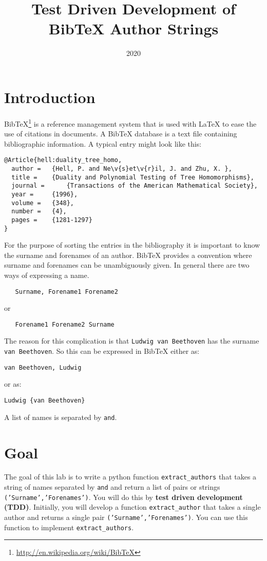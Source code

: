 \documentclass[10pt]{paper}
\title{Test Driven Development of Bib\TeX{} Author Strings}
\date{2020}
\begin{document}
\maketitle
\section*{Introduction}
Bib\TeX\footnote{\url{http://en.wikipedia.org/wiki/BibTeX}} is a
reference management system that is used with La\TeX{} to ease the use
of citations in documents. A Bib\TeX{} database is a text file
containing bibliographic information. A typical entry might look like this:
\begin{verbatim}
@Article{hell:duality_tree_homo,
  author = 	 {Hell, P. and Ne\v{s}et\v{r}il, J. and Zhu, X. },
  title = 	 {Duality and Polynomial Testing of Tree Homomorphisms},
  journal = 	 {Transactions of the American Mathematical Society},
  year = 	 {1996},
  volume =	 {348},
  number =	 {4},
  pages =	 {1281-1297}
}
\end{verbatim}

For the purpose of sorting the entries in the bibliography it is
important to know the surname and forenames of an author. Bib\TeX{}
provides a convention where surname and forenames can be unambiguously
given. In general there are two ways of expressing a name.
\begin{verbatim}
   Surname, Forename1 Forename2
\end{verbatim}
or
\begin{verbatim}
   Forename1 Forename2 Surname
\end{verbatim}
The reason for this complication is that {\tt Ludwig van Beethoven}
has the surname {\tt van Beethoven}. So this can be expressed in
Bib\TeX{} either as: 
\begin{verbatim}
van Beethoven, Ludwig
\end{verbatim}
or as: 
\begin{verbatim}
Ludwig {van Beethoven}
\end{verbatim}

A list of names is separated by {\tt and}. 

\section*{Goal}
The goal of this lab is to write a python function \texttt
{extract\_authors} that takes a string of names separated by
\texttt{and} and return a list of pairs or strings
\texttt{('Surname','Forenames')}. You will do this by \textbf{test
  driven development (TDD)}.  Initially, you will develop a function
\texttt{extract\_author} that takes a single author and returns a
single pair \texttt{('Surname','Forenames')}.  You can use this
function to implement \texttt{extract\_authors}.
\end{document}
